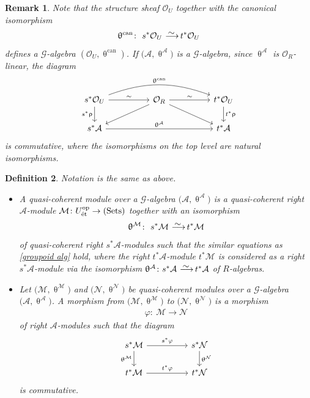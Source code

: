 \documentclass[pdftex]{sigma}%
\newtheorem{dfn}{Definition}[section]
\newtheorem{rem}[dfn]{Remark}
\numberwithin{equation}{section}
\newcommand{\Sets}{\operatorname{Sets}}
\newcommand{\op}{\operatorname{op}}
\newcommand{\can}{\operatorname{can}}
\newcommand{\et}{\text{\rm \'et}}
\newcommand{\cA}{\mathcal{A}}
\newcommand{\cG}{\mathcal{G}}
\newcommand{\cM}{\mathcal{M}}
\newcommand{\cN}{\mathcal{N}}
\newcommand{\cO}{\mathcal{O}}
\newcommand{\simto}{\,\,\,\,\raisebox{4pt}{$\sim$}{\kern -1.1em \longrightarrow}\,}
\begin{document}
\begin{rem}\label{str equiv}
Note that the structure sheaf $\cO_U$ together with the canonical isomorphism
\begin{gather*}
\uptheta^{\can}\colon\ s^*\cO_U\simto t^*\cO_U
\end{gather*}
defines a $\cG$-algebra $(\cO_U, \uptheta^{\can})$. If $\big(\cA,\uptheta^{\cA}\big)$ is a $\cG$-algebra, since $\uptheta^{\cA}$ is $\cO_R$-linear, the diagram
\[
\begin{tikzcd}
s^*\cO_U\arrow[rr,"\sim"]\arrow[d,"s^*\uprho"']\arrow[rrrr, bend left=20,swap, "\uptheta^{\can}"']&&\cO_R\arrow[lld," "]\arrow[rrd," "]\arrow[rr,"\sim"]&&t^*\cO_U\arrow[d,"t^*\uprho"]\\
s^*\cA\arrow[rrrr, "\uptheta^{\cA}"]&&&&t^*\cA
\end{tikzcd}
\]
is commutative, where the isomorphisms on the top level are natural isomorphisms.
\end{rem}


\begin{dfn} Notation is the same as above.
\begin{itemize}\itemsep=0pt
\item[1.] A {\it quasi-coherent module} over a $\cG$-algebra $\big(\cA,\uptheta^{\cA}\big)$ is a quasi-coherent right $\cA$-module $\cM\colon U^{\op}_{\et}\to (\Sets)$ together with an isomorphism
\begin{gather*}
\uptheta^{\cM}\colon\ s^*\cM\simto t^*\cM
\end{gather*}
of quasi-coherent right $s^*\cA$-modules such that the similar equations as \eqref{groupoid alg} hold, where the right $t^*\cA$-module $t^*\cM$ is considered as a right $s^*\cA$-module via the isomorphism $\uptheta^{\cA}\colon s^*\cA\simto t^*\cA$ of $R$-algebras.
\item[2.] Let $\big(\cM,\uptheta^{\cM}\big)$ and $\big(\cN,\uptheta^{\cN}\big)$ be quasi-coherent modules over a $\cG$-algebra $\big(\cA,\uptheta^{\cA}\big)$.
A {\it morphism} from $\big(\cM,\uptheta^{\cM}\big)$ to $\big(\cN,\uptheta^{\cN}\big)$ is a morphism
\begin{gather*}
\varphi\colon\ \cM\to \cN
\end{gather*}
of right $\cA$-modules such that the diagram
\[
\begin{tikzcd}
s^*\cM\arrow[rr,"s^*\varphi"]\arrow[d,"\uptheta^{\cM}"']&&s^*\cN\arrow[d," \uptheta^{\cN}"]\\
t^*\cM\arrow[rr, "t^*\varphi"]&&t^*\cN
\end{tikzcd}
\]
is commutative.
\end{itemize}
\end{dfn}
\end{document}
